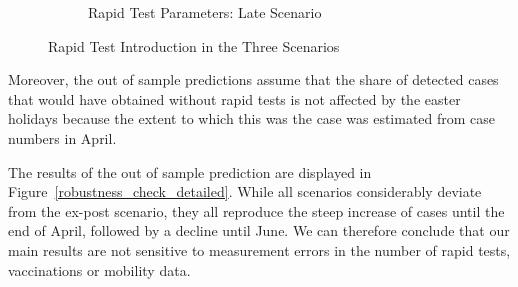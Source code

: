 \begin{figure}[ht]
\begin{subfigure}[b]{0.3\textwidth}
    \caption{Rapid Test Parameters: Late Scenario}
    \label{fig:robustness_late_params}
  \end{subfigure}

  \caption{Rapid Test Introduction in the Three Scenarios}
  \label{fig:robustness_check_rapid_test_params}

\end{figure}

Moreover, the out of sample predictions assume that the share of detected cases that
would have obtained without rapid tests is not affected by the easter holidays because
the extent to which this was the case was estimated from case numbers in April.

The results of the out of sample prediction are displayed in
Figure~\ref{robustness_check_detailed}. While all scenarios considerably deviate from
the ex-post scenario, they all reproduce the steep increase of cases until the end
of April, followed by a decline until June. We can therefore conclude that our main
results are not sensitive to measurement errors in the number of rapid tests,
vaccinations or mobility data.


